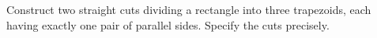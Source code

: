 Construct two straight cuts dividing a rectangle into three trapezoids, each having exactly one pair of parallel sides. Specify the cuts precisely.
